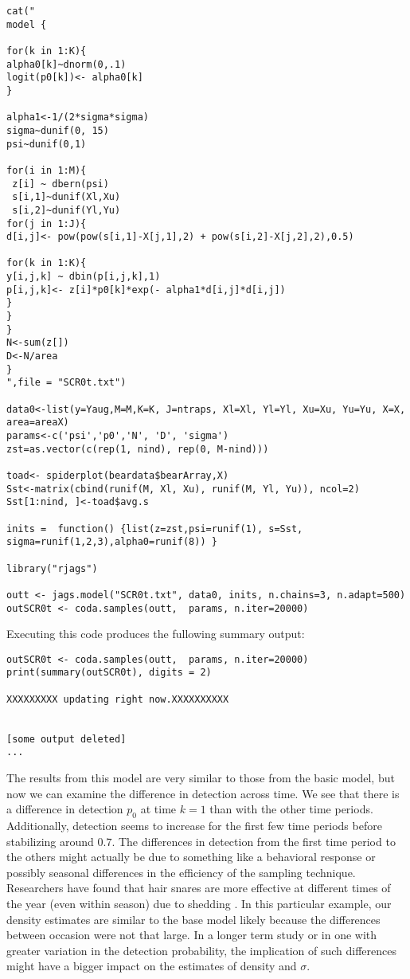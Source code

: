{\small
\begin{verbatim}
cat("
model {

for(k in 1:K){
alpha0[k]~dnorm(0,.1)
logit(p0[k])<- alpha0[k]
}

alpha1<-1/(2*sigma*sigma)
sigma~dunif(0, 15)
psi~dunif(0,1)

for(i in 1:M){
 z[i] ~ dbern(psi)
 s[i,1]~dunif(Xl,Xu)
 s[i,2]~dunif(Yl,Yu)
for(j in 1:J){
d[i,j]<- pow(pow(s[i,1]-X[j,1],2) + pow(s[i,2]-X[j,2],2),0.5)

for(k in 1:K){
y[i,j,k] ~ dbin(p[i,j,k],1)
p[i,j,k]<- z[i]*p0[k]*exp(- alpha1*d[i,j]*d[i,j])
}
}
}
N<-sum(z[])
D<-N/area
}
",file = "SCR0t.txt")

data0<-list(y=Yaug,M=M,K=K, J=ntraps, Xl=Xl, Yl=Yl, Xu=Xu, Yu=Yu, X=X, area=areaX)
params<-c('psi','p0','N', 'D', 'sigma')
zst=as.vector(c(rep(1, nind), rep(0, M-nind)))

toad<- spiderplot(beardata$bearArray,X)
Sst<-matrix(cbind(runif(M, Xl, Xu), runif(M, Yl, Yu)), ncol=2)
Sst[1:nind, ]<-toad$avg.s

inits =  function() {list(z=zst,psi=runif(1), s=Sst, sigma=runif(1,2,3),alpha0=runif(8)) }

library("rjags")

outt <- jags.model("SCR0t.txt", data0, inits, n.chains=3, n.adapt=500)
outSCR0t <- coda.samples(outt,  params, n.iter=20000)
\end{verbatim}
}

Executing this code produces the fullowing summary output:
{\small 
\begin{verbatim}
outSCR0t <- coda.samples(outt,  params, n.iter=20000)
print(summary(outSCR0t), digits = 2)

XXXXXXXXX updating right now.XXXXXXXXXX


[some output deleted]
...
\end{verbatim}
}


The results from this model are very similar to those from the basic
model, but now we can examine the difference in detection across time.
We see that there is a difference in detection $p_0$ at time $k=1$
than with the other time periods.  Additionally, detection seems to
increase for the first few time periods before stabilizing around $0.7$.
The differences in detection from the first time period to the others might 
actually be due to something like a behavioral response or possibly seasonal
differences in the efficiency of the sampling technique.  
Researchers have found that hair snares are more effective at different
times of the year (even within season) due to shedding \citep{wegan_etal:inpress}.  
In this particular example, our density estimates are
similar to the base model likely because the differences between occasion were not that large.
In a longer term study or in one with greater variation in the detection probability, 
the implication of such differences might have a bigger impact on the estimates of density
and $\sigma$.  

